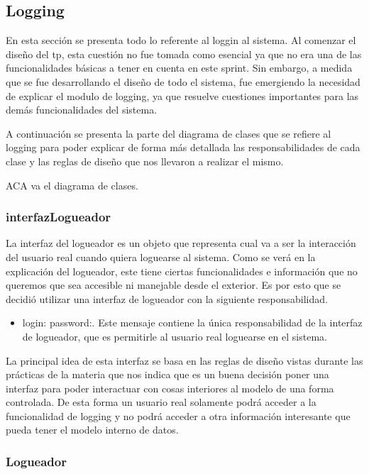 \subsection{Logging}

En esta secci\'on se presenta todo lo referente al loggin al sistema. Al comenzar el diseño del tp, esta cuesti\'on no fue tomada como esencial ya que no era una de las funcionalidades b\'asicas a tener en cuenta en este sprint. Sin embargo, a medida que se fue desarrollando el diseño de todo el sistema, fue emergiendo la necesidad de explicar el modulo de logging, ya que resuelve cuestiones importantes para las dem\'as funcionalidades del sistema.

A continuaci\'on se presenta la parte del diagrama de clases que se refiere al logging para poder explicar de forma m\'as detallada las responsabilidades de cada clase y las reglas de diseño que nos llevaron a realizar el mismo.

ACA va el diagrama de clases.


\subsubsection{interfazLogueador}

La interfaz del logueador es un objeto que representa cual va a ser la interacci\'on del usuario real cuando quiera loguearse al sistema. Como se ver\'a en la explicaci\'on del logueador, este tiene ciertas funcionalidades e informaci\'on que no queremos que sea accesible ni manejable desde el exterior. Es por esto que se decidi\'o utilizar una interfaz de logueador con la siguiente responsabilidad.

\begin{itemize}
\item login: password:. Este mensaje contiene la \'unica responsabilidad de la interfaz de logueador, que es permitirle al usuario real loguearse en el sistema.
\end{itemize}

La principal idea de esta interfaz se basa en las reglas de diseño vistas durante las pr\'acticas de la materia que nos indica que es un buena decisi\'on poner una interfaz para poder interactuar con cosas interiores al modelo de una forma controlada. De esta forma un usuario real solamente podr\'a acceder a la funcionalidad de logging y no podr\'a acceder a otra informaci\'on interesante que pueda tener el modelo interno de datos. 

\subsubsection{Logueador}

